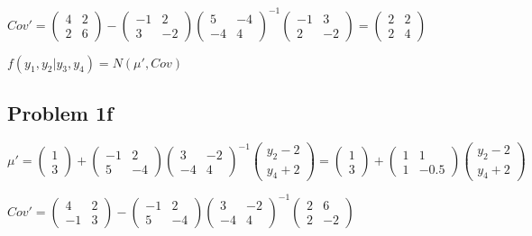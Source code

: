 \documentclass[a4paper]{article}
\begin{document}
$Cov' = \begin{pmatrix} 4 & 2\\ 2 & 6 \end{pmatrix}-\begin{pmatrix} -1 & 2\\ 3 & -2 \end{pmatrix} \begin{pmatrix} 5 & -4\\ -4 & 4\end{pmatrix}^{-1}\begin{pmatrix}-1 & 3\\ 2 & -2 \end{pmatrix}=
\begin{pmatrix}2 & 2\\ 2& 4 \end{pmatrix}$

 $f(y_1, y_2 |y_3, y_4) = N(\mu', Cov)$
 
 
 
\subsection*{Problem 1f}

$\mu' =  \begin{pmatrix} 1 \\3 \end{pmatrix} + \begin{pmatrix} -1 & 2\\ 5 &-4 \end{pmatrix}\begin{pmatrix} 3 & -2 \\-4 & 4\end{pmatrix}^{-1}\begin{pmatrix}y_2-2\\ y_4+2\end{pmatrix} = \begin{pmatrix} 1 \\3 \end{pmatrix} + \begin{pmatrix} 1 & 1 \\ 1 & -0.5\end{pmatrix}\begin{pmatrix}y_2-2\\ y_4+2\end{pmatrix}$

$Cov' = \begin{pmatrix} 4 & 2\\ -1 & 3 \end{pmatrix} - \begin{pmatrix} -1 & 2\\ 5 &-4 \end{pmatrix}\begin{pmatrix} 3 & -2 \\-4 & 4\end{pmatrix}^{-1} \begin{pmatrix} 2 & 6\\ 2 & -2\end{pmatrix} $
\end{document}
